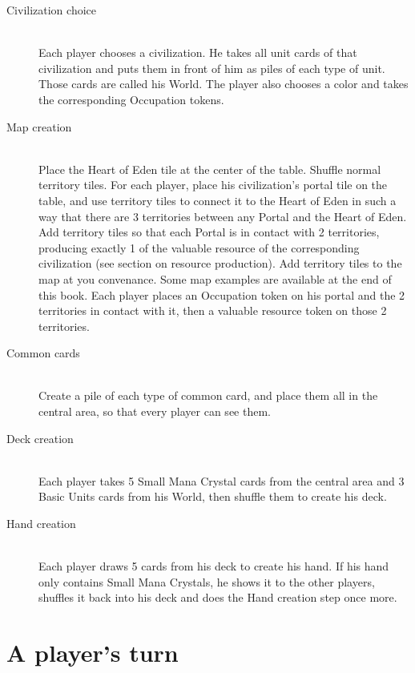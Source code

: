 \documentclass[a4paper]{article}
\begin{document}
    \begin{description}
        \item[Civilization choice] \hfill \\
            Each player chooses a civilization.
            He takes all unit cards of that civilization and puts them in front of him as piles of each type of unit.
            Those cards are called his World.
            The player also chooses a color and takes the corresponding Occupation tokens.
        \item[Map creation] \hfill \\
            Place the Heart of Eden tile at the center of the table.
            Shuffle normal territory tiles.
            For each player, place his civilization's portal tile on the table, and use territory tiles
            to connect it to the Heart of Eden in such a way that there are 3 territories between any Portal and the Heart of Eden.
            Add territory tiles so that each Portal is in contact with 2 territories, producing exactly 1 of the valuable
            resource of the corresponding civilization (see section on resource production).
            Add territory tiles to the map at you convenance. Some map examples are available at the end of this book.
            Each player places an Occupation token on his portal and the 2 territories in contact with it,
            then a valuable resource token on those 2 territories.
        \item[Common cards] \hfill \\
            Create a pile of each type of common card, and place them all in the central area, so that
            every player can see them.
        \item[Deck creation] \hfill \\
            Each player takes 5 Small Mana Crystal cards from the central area and
            3 Basic Units cards from his World, then shuffle them to create his deck.
        \item[Hand creation] \hfill \\
            Each player draws 5 cards from his deck to create his hand.
            If his hand only contains Small Mana Crystals, he shows it to the other players, shuffles it back into his deck
            and does the Hand creation step once more.
    \end{description}


\newpage
\section{A player's turn}
\end{document}
